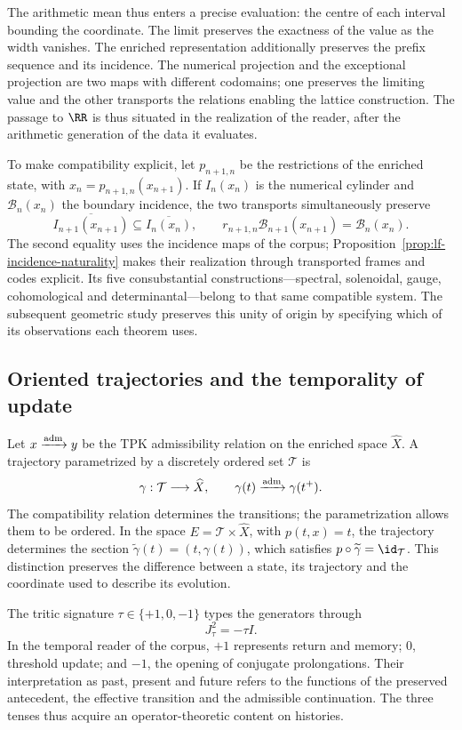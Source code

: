 The arithmetic mean thus enters a precise evaluation: the
centre of each interval bounding the coordinate. The limit preserves the
exactness of the value as the width vanishes. The enriched
representation additionally preserves the prefix sequence and its incidence.
The numerical projection and the exceptional projection are two maps
with different codomains; one preserves the limiting value and the other transports
the relations enabling the lattice construction. The passage to
\(\RR\) is thus situated in the realization of the reader, after the
arithmetic generation of the data it evaluates.

To make compatibility explicit, let \(p_{n+1,n}\) be the restrictions
of the enriched state, with \(x_n=p_{n+1,n}(x_{n+1})\). If \(I_n(x_n)\)
is the numerical cylinder and \(\mathcal B_n(x_n)\) the boundary incidence,
the two transports simultaneously preserve
\[
 \overline{I_{n+1}(x_{n+1})}\subseteq\overline{I_n(x_n)},\qquad
 r_{n+1,n}\mathcal B_{n+1}(x_{n+1})=\mathcal B_n(x_n).
\]
The second equality uses the incidence maps of the corpus;
Proposition~\ref{prop:lf-incidence-naturality} makes their realization
through transported frames and codes explicit. Its five
consubstantial constructions---spectral, solenoidal, gauge, cohomological
and determinantal---belong to that same compatible system. The subsequent
geometric study preserves this unity of origin by specifying which
of its observations each theorem uses.

\subsection{Oriented trajectories and the temporality of update}

Let \(x\xrightarrow{\rm adm}y\) be the TPK admissibility relation on
the enriched space \(\widehat X\). A trajectory parametrized by
a discretely ordered set \(\mathcal T\) is
\[
 \gamma:\mathcal T\longrightarrow\widehat X,
 \qquad\gamma(t)\xrightarrow{\rm adm}\gamma(t^+).
\]
The compatibility relation determines the transitions; the parametrization
allows them to be ordered. In the space \(E=\mathcal T\times\widehat X\),
with \(p(t,x)=t\), the trajectory determines the section
\(\widetilde\gamma(t)=(t,\gamma(t))\), which satisfies
\(p\circ\widetilde\gamma=\id_{\mathcal T}\).
This distinction preserves the difference between a state, its trajectory and
the coordinate used to describe its evolution.

The tritic signature \(\tau\in\{+1,0,-1\}\) types the generators through
\[
 J_\tau^2=-\tau I.
\]
In the temporal reader of the corpus, \(+1\) represents return and memory;
\(0\), threshold update; and \(-1\), the opening of conjugate
prolongations. Their interpretation as past, present and future refers
to the functions of the preserved antecedent, the effective transition and the
admissible continuation. The three tenses thus acquire an
operator-theoretic content on histories.

